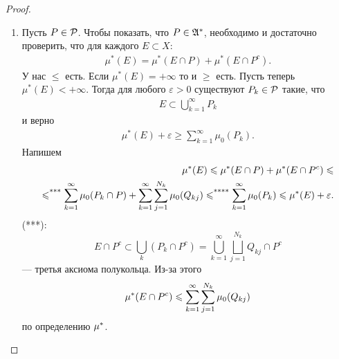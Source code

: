 \documentclass[a4paper,14pt]{extarticle}
\theoremstyle{definition}
\theoremstyle{plain}
\theoremstyle{plain}
\theoremstyle{plain}
\theoremstyle{plain}
\theoremstyle{definition}
\theoremstyle{definition}
\theoremstyle{definition}
\theoremstyle{definition}
\theoremstyle{definition}
\theoremstyle{definition}
\theoremstyle{plain}
\theoremstyle{plain}
\theoremstyle{plain}
\theoremstyle{plain}
\theoremstyle{definition}
\theoremstyle{definition}
\theoremstyle{definition}
\theoremstyle{definition}
\theoremstyle{definition}
\newcommand{\A}{\ensuremath \mathfrak{A}}
\newcommand{\p}{\ensuremath \mathcal{P}}
\newcommand{\mua}{\ensuremath \mu^\ast}
\begin{document}
\begin{proof}\
 \begin{enumerate}
  \item Пусть $ P \in \p $. Чтобы показать, что $ P \in \A^\ast $, необходимо и достаточно проверить, что для каждого $ E \subset X $:
   \begin{align*}
    \mu^\ast(E) = \mu^\ast(E \cap P) + \mu^\ast(E \cap P^c)
   .\end{align*} У нас $ \leqslant $ есть. Если $ \mu^\ast(E) = +\infty $ то и $ \geqslant $ есть. Пусть теперь $ \mu^\ast(E) < +\infty $. Тогда для любого $ \varepsilon > 0 $ существуют $ P_k \in \p $ такие, что
   \begin{align*}
    E \subset \bigcup_{k=1}^\infty P_k
   \end{align*} и верно
   \begin{align*}
    \mu^\ast(E) + \varepsilon \geqslant \sum_{k=1}^{\infty} \mu_0(P_k)
   .\end{align*} Напишем
   \begin{align*}
    \mu^\ast(E) \leqslant \mua(E \cap P) + \mua(E \cap P^c) \leqslant \\
    \leqslant^{\text{***}} \sum_{k=1}^{\infty} \mu_0(P_k \cap P) + \sum_{k=1}^{\infty} \sum_{j=1}^{N_k}   \mu_0 (Q_{kj} ) \leqslant^{\text{****}} \sum_{k=1}^{\infty} \mu_0(P_k) \leqslant \mua(E) + \varepsilon
   .\end{align*} (***): $$ E \cap P^c \subset \bigcup_k (P_k \cap P^c) = \bigcup_{k=1}^\infty \bigsqcup_{j=1}^{N_k} Q_{kj} \cap P^c $$ --- третья аксиома полукольца. Из-за этого
   \begin{align*}
    \mua(E \cap P^c) \leqslant \sum_{k=1}^{\infty} \sum_{j=1}^{N_k}  \mu_0(Q_{kj})
   \end{align*} по определению $ \mua $.


\end{enumerate}
\end{proof}
\end{document}
